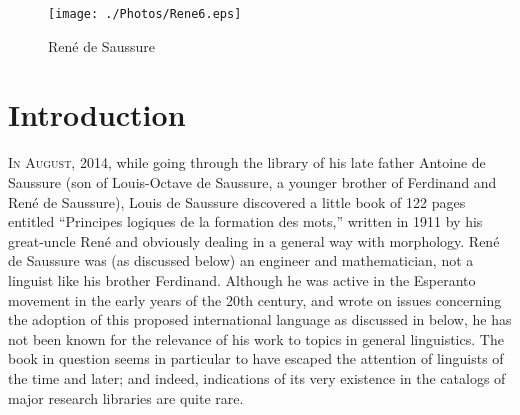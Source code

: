 
{\sloppy\tableofcontents}
  
\newpage
\thispagestyle{empty}
\begin{figure}
  \texttt{[image: ./Photos/Rene6.eps]}
  \begin{center} {René de Saussure}
  \end{center}
\end{figure}
\newpage

\chapter{Introduction}
\label{ch.intro}
\begin{refsection}
\lettrine[loversize=0.1, nindent=0.25em]{I}{n August, 2014,} while
going through the library of his late father Antoine de Saussure (son
of Louis-Octave de Saussure, a younger brother of Ferdinand and Ren\'e
de Saussure), Louis de Saussure discovered a little book of 122 pages
entitled ``Principes logiques de la formation des mots,'' written in
1911 by his great-uncle René and obviously dealing in a general way
with morphology.  René de Saussure was (as discussed below) an
engineer and mathematician, not a linguist like his brother
Ferdinand. Although he was active in the Esperanto movement in the
early years of the 20th century, and wrote on issues concerning the
adoption of this proposed international language as discussed in
 below, he has not been known for the
relevance of his work to topics in general linguistics.  The book in
question seems in particular to have escaped the attention of
linguists of the time and later; and indeed, indications of its very
existence in the catalogs of major research libraries are quite rare.


\end{refsection}
